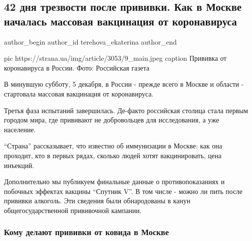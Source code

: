  
 
 
 
 
 
\subsection{42 дня трезвости после прививки. Как в Москве началась массовая вакцинация от коронавируса}
\label{sec:08_12_2020.news.ua.strana.terehova_ekaterina.1.vaccine_moskva}
\ifcmt
	author_begin
   author_id terehova_ekaterina
	author_end
\fi

\ifcmt
pic https://strana.ua/img/article/3053/9_main.jpeg
caption Прививка от коронавируса в России. Фото: Российская газета 
\fi

В минувшую субботу, 5 декабря, в России - прежде всего в Москве и области -
стартовала массовая вакцинация от коронавируса.

Третья фаза испытаний завершилась. Де-факто российская столица стала первым
городом мира, где прививают не добровольцев для исследования, а уже население. 

\enquote{Страна} рассказывает, что известно об иммунизации в Москве: как она проходит,
кто в первых рядах, сколько людей хотят вакцинировать, цена инъекций.

Дополнительно мы публикуем финальные данные о противопоказаниях и побочных
эффектах вакцины \enquote{Спутник V}. В том числе - можно ли пить после прививки
алкоголь. Эти сведения были обнародованы в канун общегосударственной
прививочной кампании. 

\subsubsection{Кому делают прививки от ковида в Москве}

